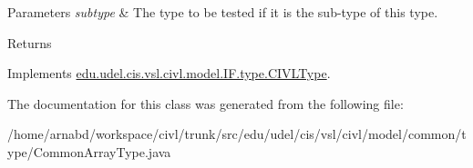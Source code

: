 \begin{DoxyParams}{Parameters}
{\em subtype} & The type to be tested if it is the sub-\/type of this type. \\
\hline
\end{DoxyParams}
\begin{DoxyReturn}{Returns}

\end{DoxyReturn}


Implements \hyperlink{interfaceedu_1_1udel_1_1cis_1_1vsl_1_1civl_1_1model_1_1IF_1_1type_1_1CIVLType_a7ad73051e2737015b6933ce30b78305d}{edu.\+udel.\+cis.\+vsl.\+civl.\+model.\+I\+F.\+type.\+C\+I\+V\+L\+Type}.



The documentation for this class was generated from the following file\+:\begin{DoxyCompactItemize}
\item 
/home/arnabd/workspace/civl/trunk/src/edu/udel/cis/vsl/civl/model/common/type/Common\+Array\+Type.\+java\end{DoxyCompactItemize}
